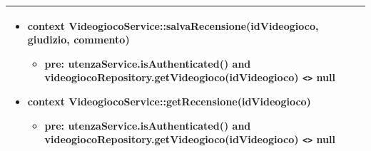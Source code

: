 \begin{tabular}{|| l | p{28em} ||}
\begin{itemize}[leftmargin=*]
		\item \textbf{context} VideogiocoService::salvaRecensione(idVideogioco, giudizio, commento)
		\begin{itemize}
			\item[ ] \textbf{pre:} utenzaService.isAuthenticated() and videogiocoRepository.getVideogioco(idVideogioco) \verb|<>| null
		\end{itemize}

		\item \textbf{context} VideogiocoService::getRecensione(idVideogioco)
		\begin{itemize}
			\item[ ] \textbf{pre:} utenzaService.isAuthenticated() and videogiocoRepository.getVideogioco(idVideogioco) \verb|<>| null
		\end{itemize}
	\end{itemize}\\
	\hline
\end{tabular}

\newpage
